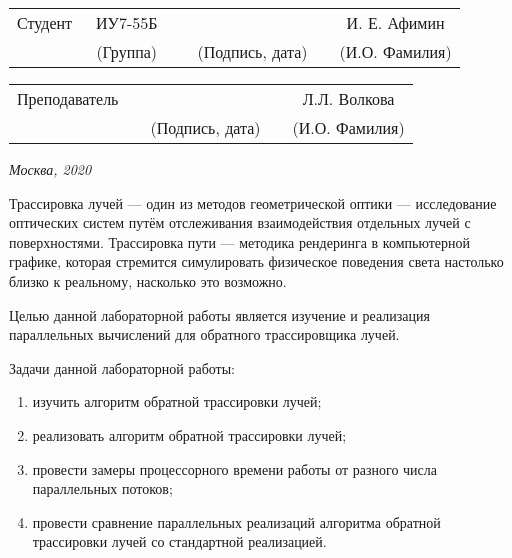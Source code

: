 \documentclass[utf8x, 12pt]{G7-32}
\begin{document}
\vspace{1.5cm}
\noindent
\begin{tabular}{l c c c c c}
    Студент      & ~ИУ7-55Б~               & \hspace{3.5cm} & \hspace{3.5cm}                 & &  И. Е. Афимин \\\cline{2-2}\cline{4-4} \cline{6-6} 
    \hspace{3cm} & {\footnotesize(Группа)} &                & {\footnotesize(Подпись, дата)} & & {\footnotesize(И.О. Фамилия)}
\end{tabular}

\vspace{1cm}

\noindent
\begin{tabular}{l c c c c}
    Преподаватель & \hspace{6cm}   & \hspace{3.5cm}                 & & Л.Л. Волкова \\\cline{3-3} \cline{5-5} 
    \hspace{3cm}  &                & {\footnotesize(Подпись, дата)} & & {\footnotesize(И.О. Фамилия)}
\end{tabular}

\begin{center}	
	\vfill
	\large \textit {Москва, 2020}
\end{center}

\thispagestyle {empty}
\pagebreak

\tableofcontents

\newpage
\Introduction    
Трассировка лучей  — один из методов геометрической оптики — исследование оптических систем путём отслеживания взаимодействия отдельных лучей с поверхностями. Трассировка пути  — методика рендеринга в компьютерной графике, которая стремится симулировать физическое поведения света настолько близко к реальному, насколько это возможно.

    Целью данной лабораторной работы является изучение и реализация параллельных вычислений
    для обратного трассировщика лучей.

    Задачи данной лабораторной работы:
    \begin{enumerate}
        \item изучить алгоритм обратной трассировки лучей;
        \item реализовать алгоритм обратной трассировки лучей;
        \item провести замеры процессорного времени работы от разного числа параллельных потоков;
        \item провести сравнение параллельных реализаций алгоритма обратной трассировки лучей со стандартной реализацией.
    \end{enumerate}
\end{document}
